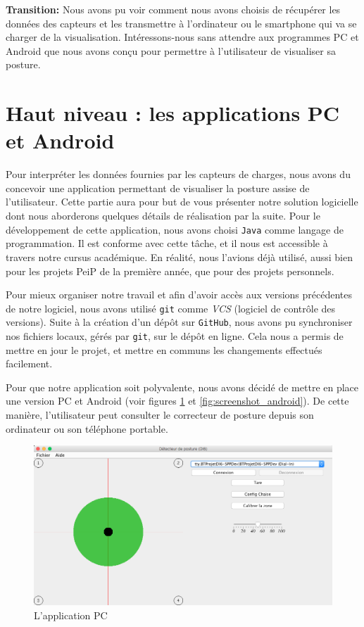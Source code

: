 \documentclass{polytech/polytech}
\begin{document}
\textbf{Transition:} Nous avons pu voir comment nous avons choisis de récupérer les données des capteurs et les transmettre à l'ordinateur ou le smartphone qui va se charger de la visualisation. Intéressons-nous sans attendre aux programmes PC et Android que nous avons conçu pour permettre à l'utilisateur de visualiser sa posture.

\section{Haut niveau : les applications PC et Android}
\label{sec:logiciel_haut}

Pour interpréter les données fournies par les capteurs de charges, nous avons du concevoir une application permettant de visualiser la posture assise de l'utilisateur.
 Cette partie aura pour but de vous présenter notre solution logicielle dont nous aborderons quelques détails de réalisation par la suite.
Pour le développement de cette application, nous avons choisi \texttt{Java} comme langage de programmation. Il est conforme avec cette tâche, et il nous est accessible à travers notre cursus académique. En réalité, nous l'avions déjà utilisé, aussi bien pour les projets PeiP de la première année, que pour des projets personnels.

Pour mieux organiser notre travail et afin d'avoir accès aux versions précédentes de notre logiciel, nous avons utilisé \texttt{git} comme \textit{VCS} (logiciel de contrôle des versions). Suite à la création d'un dépôt sur \texttt{GitHub}, nous avons pu synchroniser nos fichiers locaux, gérés par \texttt{git}, sur le dépôt en ligne. Cela nous a permis de mettre en jour le projet, et mettre en communs les changements effectués facilement.

Pour que notre application soit polyvalente, nous avons décidé de mettre en place une version PC et Android (voir figures \ref{fig:screenshot_pc} et \ref{fig:screenshot_android}). De cette manière, l'utilisateur peut consulter le correcteur de posture depuis son ordinateur ou son téléphone portable.

\begin{figure}[htbp]
\begin{center}
\includegraphics[width=12cm]{image/screenshot_pc1}
\end{center}
\caption{L'application PC}
\label{fig:screenshot_pc}
\end{figure}
\end{document}
